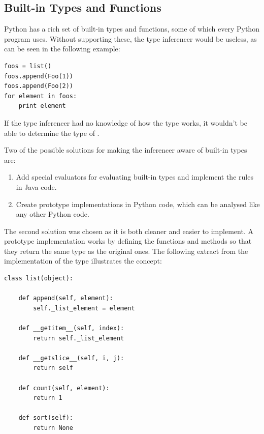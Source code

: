 \documentclass[12pt,halfparskip]{scrreprt}
\begin{document}
\subsection{Built-in Types and Functions}

Python has a rich set of built-in types and functions, some of which every Python program uses. Without supporting these, the type inferencer would be useless, as can be seen in the following example:

\begin{lstlisting}
foos = list()
foos.append(Foo(1))
foos.append(Foo(2))
for element in foos:
    print element
\end{lstlisting}

If the type inferencer had no knowledge of how the  type works, it wouldn't be able to determine the type of .

Two of the possible solutions for making the inferencer aware of built-in types are:

\begin{enumerate}
	\item Add special evaluators for evaluating built-in types and implement the rules in Java code.
	\item Create prototype implementations in Python code, which can be analysed like any other Python code.
\end{enumerate}

The second solution was chosen as it is both cleaner and easier to implement. A prototype implementation works by defining the functions and methods so that they return the same type as the original ones. The following extract from the implementation of the  type illustrates the concept:

\begin{lstlisting}
class list(object):

    def append(self, element):
        self._list_element = element

    def __getitem__(self, index):
        return self._list_element

    def __getslice__(self, i, j):
        return self

    def count(self, element):
        return 1

    def sort(self):
        return None
\end{lstlisting}

\end{document}

